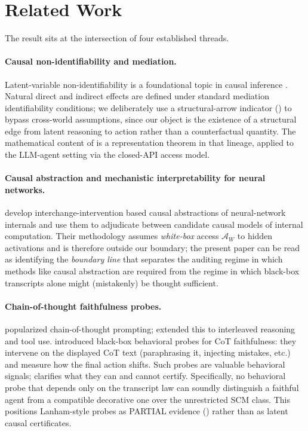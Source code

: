 \documentclass{article}
\theoremstyle{plain}
\theoremstyle{definition}
\theoremstyle{remark}
\begin{document}
\section{Related Work}\label{sec:relwork}

The result sits at the intersection of four established threads.

\paragraph{Causal non-identifiability and mediation.}
Latent-variable non-identifiability is a foundational topic in causal
inference \citep{pearl2009}. Natural direct and indirect effects
\citep{pearl2001direct} are defined under standard mediation identifiability
conditions; we deliberately use a structural-arrow indicator
() to bypass cross-world assumptions, since our object is the
existence of a structural edge from latent reasoning to action rather than
a counterfactual quantity. The mathematical content of
 is a representation theorem in that lineage,
applied to the LLM-agent setting via the closed-API access model.

\paragraph{Causal abstraction and mechanistic interpretability for neural
networks.}
\citet{geiger2022inducing,geiger2023causal} develop interchange-intervention
based causal abstractions of neural-network internals and use them to
adjudicate between candidate causal models of internal computation. Their
methodology assumes \emph{white-box} access $\mathcal{A}_W$ to hidden
activations and is therefore outside our boundary; the present paper can be
read as identifying the \emph{boundary line} that separates the auditing
regime in which methods like causal abstraction are required from the regime
in which black-box transcripts alone might (mistakenly) be thought
sufficient.

\paragraph{Chain-of-thought faithfulness probes.}
\citet{wei2022cot} popularized chain-of-thought prompting; \citet{yao2023react}
extended this to interleaved reasoning and tool use. \citet{lanham2023measuring}
introduced black-box behavioral probes for CoT faithfulness: they intervene
on the displayed CoT text (paraphrasing it, injecting mistakes, etc.) and
measure how the final action shifts. Such probes are valuable behavioral
signals;  clarifies what they can and cannot
certify. Specifically, no behavioral probe that depends only on the
transcript law can soundly distinguish a faithful agent from a compatible
decorative one over the unrestricted SCM class. This positions Lanham-style
probes as PARTIAL evidence () rather than as latent
causal certificates.
\end{document}
